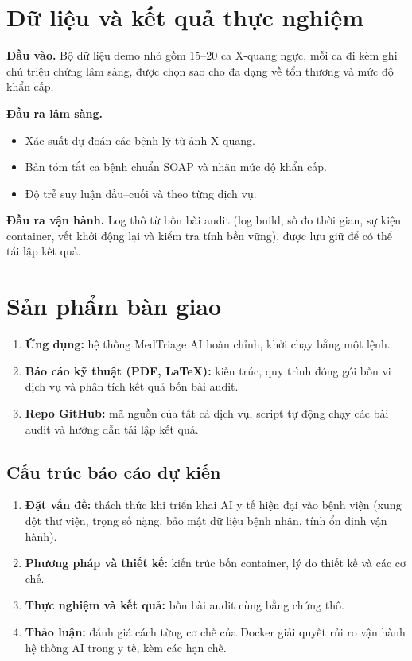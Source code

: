 \documentclass[11pt,a4paper]{article}
\begin{document}
\section{Dữ liệu và kết quả thực nghiệm}
\textbf{Đầu vào.} Bộ dữ liệu demo nhỏ gồm 15--20 ca X-quang ngực, mỗi ca đi kèm ghi chú triệu chứng lâm sàng, được chọn sao cho đa dạng về tổn thương và mức độ khẩn cấp.

\textbf{Đầu ra lâm sàng.}
\begin{itemize}
  \item Xác suất dự đoán các bệnh lý từ ảnh X-quang.
  \item Bản tóm tắt ca bệnh chuẩn SOAP và nhãn mức độ khẩn cấp.
  \item Độ trễ suy luận đầu--cuối và theo từng dịch vụ.
\end{itemize}

\textbf{Đầu ra vận hành.} Log thô từ bốn bài audit (log build, số đo thời gian, sự kiện container, vết khởi động lại và kiểm tra tính bền vững), được lưu giữ để có thể tái lập kết quả.

\section{Sản phẩm bàn giao}
\begin{enumerate}
  \item \textbf{Ứng dụng:} hệ thống MedTriage AI hoàn chỉnh, khởi chạy bằng một lệnh.
  \item \textbf{Báo cáo kỹ thuật (PDF, LaTeX):} kiến trúc, quy trình đóng gói bốn vi dịch vụ và phân tích kết quả bốn bài audit.
  \item \textbf{Repo GitHub:} mã nguồn của tất cả dịch vụ, script tự động chạy các bài audit và hướng dẫn tái lập kết quả.
\end{enumerate}

\subsection*{Cấu trúc báo cáo dự kiến}
\begin{enumerate}
  \item \textbf{Đặt vấn đề:} thách thức khi triển khai AI y tế hiện đại vào bệnh viện (xung đột thư viện, trọng số nặng, bảo mật dữ liệu bệnh nhân, tính ổn định vận hành).
  \item \textbf{Phương pháp và thiết kế:} kiến trúc bốn container, lý do thiết kế và các cơ chế.
  \item \textbf{Thực nghiệm và kết quả:} bốn bài audit cùng bằng chứng thô.
  \item \textbf{Thảo luận:} đánh giá cách từng cơ chế của Docker giải quyết rủi ro vận hành hệ thống AI trong y tế, kèm các hạn chế.
\end{enumerate}
\end{document}
